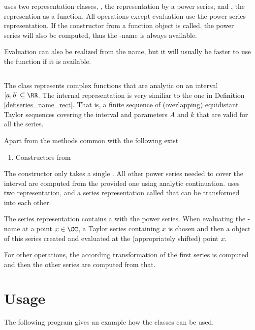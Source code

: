		\baana uses two representation classes, , the representation by a power series, and , the represention as a function. 
		All operations except evaluation use the power series representation. 
		If the constructor from a function object is called, the power series will also be computed, 
		thus the -name is always available.

		Evaluation can also be realized from the  name, but it will usually be faster 
		to use the function if it is available.

	\subsection{\anarect}
		The class \anarect represents complex functions that are analytic on an interval $[a, b] \subseteq \RR$.
		The internal representation is very similiar to the one in Definition \ref{def:series_name_rect}.
		That is, a finite sequence of (overlapping) equidistant Taylor sequences covering the interval and parameters $A$ and $k$ 
		that are valid for all the series.

		Apart from the methods common with \baana the following exist
		\begin{enumerate}
			\item Constructors from 
		\end{enumerate}
		The constructor only takes a single \powerseries.
		All other power series needed to cover the interval are computed from the provided one using analytic 
		continuation.  
		\textbf{\anarect} uses two representation,  and a series representation called  that can be transformed into each other.

		The series representation  contains a  with the power series.
		When evaluating the -name at a point $x \in \CC$, 
		a Taylor series containing $x$ is chosen and then a \baana object of this series created and evaluated at 
		the (appropriately shifted) point $x$. 

		For other operations, the according transformation of the first series is computed and then the 
		other series are computed from that.    
	\section{Usage}
		The following \cc program gives an example how the classes can be used.
		
